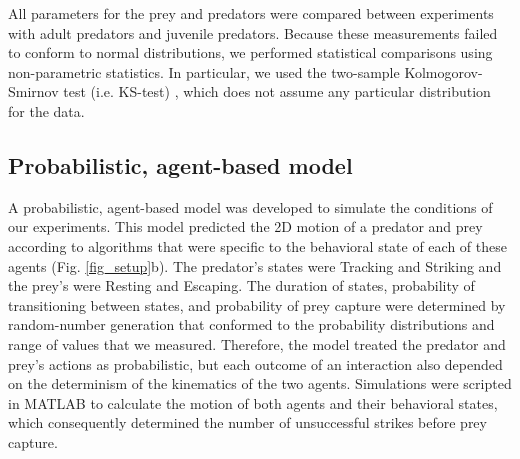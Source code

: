 \documentclass[]{rsos}%
\begin{document}
All parameters for the prey and predators were compared between experiments with adult predators and juvenile predators.
Because these measurements failed to conform to normal distributions, we performed statistical comparisons using non-parametric statistics.
In particular, we used the two-sample Kolmogorov-Smirnov test (i.e. KS-test) \cite{MasseyJr:1951jo}, which does not assume any particular distribution for the data. 


\subsection{Probabilistic, agent-based model}
A probabilistic, agent-based model was developed to simulate the conditions of our experiments. 
This model predicted the 2D motion of a predator and prey \cite{Isaacs:1965uz} according to algorithms that were specific to the behavioral state of each of these agents (Fig. \ref{fig_setup}b). 
The predator's states were Tracking and Striking and the prey's were Resting and Escaping. 
The duration of states, probability of transitioning between states, and probability of prey capture were determined by random-number generation that conformed to the probability distributions and range of values that we measured.
Therefore, the model treated the predator and prey's actions as probabilistic, but each outcome of an interaction also depended on the determinism of the kinematics of the two agents.
Simulations were scripted in MATLAB to calculate the motion of both agents and their behavioral states, which consequently determined the number of unsuccessful strikes before prey capture.
\end{document}
